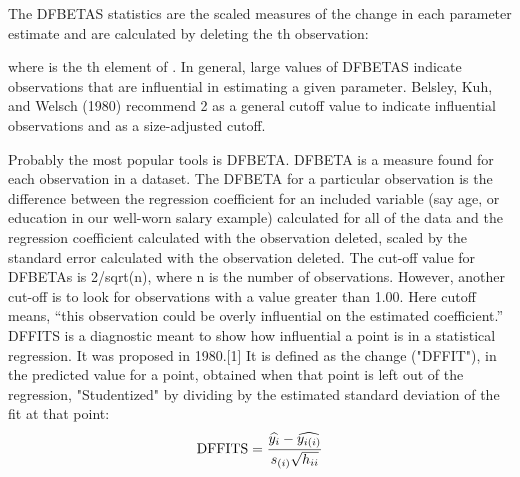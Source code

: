 The DFBETAS statistics are the scaled measures of the change in each parameter estimate and are calculated by deleting the th observation:
 		 	 
where  is the th element of .
In general, large values of DFBETAS indicate observations that are influential in estimating a given parameter. Belsley, Kuh, and Welsch (1980) recommend 2 as a general cutoff value to indicate influential observations and  as a size-adjusted cutoff.

Probably the most popular 
tools is DFBETA. DFBETA is a measure found for each observation in a dataset. The DFBETA for a 
particular observation is the difference between the regression coefficient for an included variable (say 
age, or education in our well-worn salary example) calculated for all of the data and the regression 
coefficient calculated with the observation deleted, scaled by the standard error calculated with the 
observation deleted. The cut-off value for DFBETAs is 2/sqrt(n), where n is the number of observations. 
However, another cut-off is to look for observations with a value greater than 1.00. Here cutoff means, 
“this observation could be overly influential on the estimated coefficient.” 
DFFITS is a diagnostic meant to show how influential a point is in a statistical regression. It was proposed in 1980.[1] It is defined as the change ("DFFIT"), in the predicted value for a point, obtained when that point is left out of the regression, "Studentized" by dividing by the estimated standard deviation of the fit at that point:
\[ \text{DFFITS} = {\widehat{y_i} - \widehat{y_{i(i)}} \over s_{(i)} \sqrt{h_{ii}}}\]

